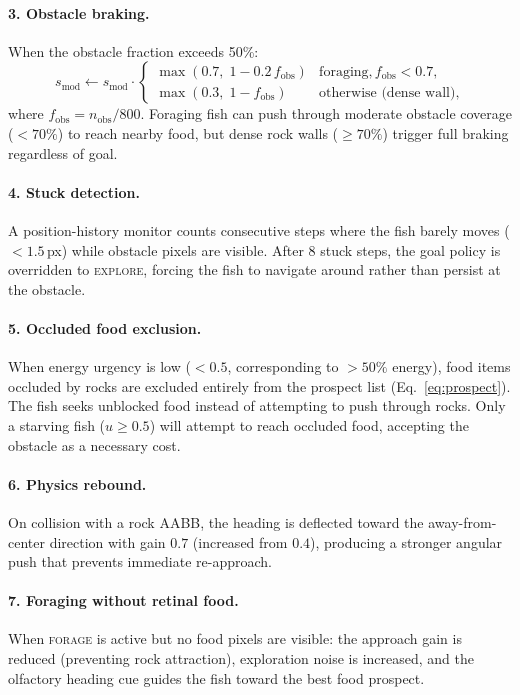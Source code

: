 \documentclass[11pt,a4paper]{article}
\begin{document}
\paragraph{3. Obstacle braking.}
When the obstacle fraction exceeds 50\%:
\begin{equation}\label{eq:obs_braking}
  s_\text{mod} \leftarrow s_\text{mod} \cdot
  \begin{cases}
    \max(0.7,\; 1 - 0.2\,f_\text{obs}) & \text{foraging}, f_\text{obs} < 0.7, \\
    \max(0.3,\; 1 - f_\text{obs})       & \text{otherwise (dense wall)},
  \end{cases}
\end{equation}
where $f_\text{obs} = n_\text{obs} / 800$.
Foraging fish can push through moderate obstacle coverage ($< 70\%$)
to reach nearby food, but dense rock walls ($\geq 70\%$) trigger
full braking regardless of goal.

\paragraph{4. Stuck detection.}
A position-history monitor counts consecutive steps where the fish
barely moves ($< 1.5$\,px) while obstacle pixels are visible.
After 8 stuck steps, the goal policy is overridden to \textsc{explore},
forcing the fish to navigate around rather than persist at the obstacle.

\paragraph{5. Occluded food exclusion.}
When energy urgency is low ($< 0.5$, corresponding to $> 50\%$ energy),
food items occluded by rocks are excluded entirely from the prospect
list (Eq.~\ref{eq:prospect}).
The fish seeks unblocked food instead of attempting to push through
rocks.  Only a starving fish ($u \geq 0.5$) will attempt to reach
occluded food, accepting the obstacle as a necessary cost.

\paragraph{6. Physics rebound.}
On collision with a rock AABB, the heading is deflected toward the
away-from-center direction with gain $0.7$ (increased from $0.4$),
producing a stronger angular push that prevents immediate re-approach.

\paragraph{7. Foraging without retinal food.}
When \textsc{forage} is active but no food pixels are visible:
the approach gain is reduced (preventing rock attraction),
exploration noise is increased, and the olfactory heading cue
guides the fish toward the best food prospect.
\end{document}
